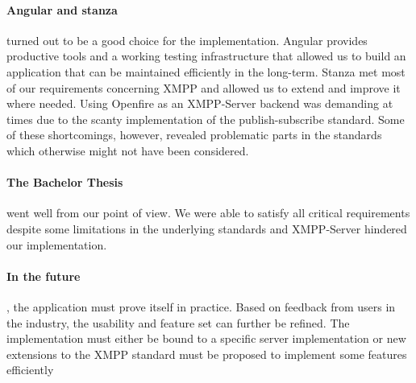 \paragraph{Angular and stanza} turned out to be a good choice for the implementation.
Angular provides productive tools and a working testing infrastructure that allowed us to build an application that can be maintained efficiently in the long-term.
Stanza met most of our requirements concerning XMPP and allowed us to extend and improve it where needed.
Using Openfire as an XMPP-Server backend was demanding at times due to the scanty implementation of the \gls{publish-subscribe} standard.
Some of these shortcomings, however, revealed problematic parts in the standards which otherwise might not have been considered.

\paragraph{The Bachelor Thesis} went well from our point of view.
We were able to satisfy all critical requirements despite some limitations in the underlying standards and XMPP-Server hindered our implementation.

\paragraph{In the future}, the application must prove itself in practice.
Based on feedback from users in the industry, the usability and feature set can further be refined.
The implementation must either be bound to a specific server implementation or new extensions to the XMPP standard must be proposed to implement some features efficiently